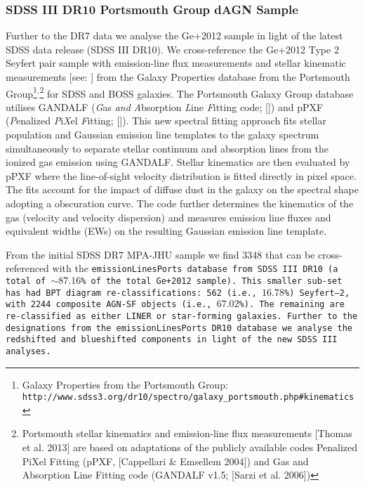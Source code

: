 \subsubsection{SDSS III DR10 Portsmouth Group dAGN Sample}

Further to the DR7 data we analyse the Ge+2012 sample in light of the latest SDSS data release (SDSS III DR10). We cross-reference the Ge+2012 Type 2 Seyfert pair sample with emission-line flux measurements and stellar kinematic measurements [see: \cite{Thomas_2013}] from the Galaxy Properties database from the Portsmouth Group\footnote{\tiny{Galaxy Properties from the Portsmouth Group: \tt{http://www.sdss3.org/dr10/spectro/galaxy_portsmouth.php#kinematics}}}$^{\text{,}}$\footnote{\tiny{Portsmouth stellar kinematics and emission-line flux measurements [Thomas et al. 2013] are based on adaptations of the publicly available codes Penalized PiXel Fitting (pPXF, [Cappellari \& Emsellem 2004]) and Gas and Absorption Line Fitting code (GANDALF v1.5; [Sarzi et al. 2006])}} for SDSS and BOSS galaxies. The Portsmouth Galaxy Group database utilises GANDALF (\textit{G}as \textit{and} \textit{A}bsorption \textit{L}ine \textit{F}itting code; [\cite{Sarzi_2006}]) and pPXF (\textit{P}enalized \textit{P}i\textit{X}el \textit{F}itting; [\cite{2012ascl.soft10002C}]). This new spectral fitting approach fits stellar population and Gaussian emission line templates to the galaxy spectrum simultaneously to separate stellar continuum and absorption lines from the ionized gas emission using GANDALF. Stellar kinematics are then evaluated by pPXF where the line-of-sight velocity distribution is fitted directly in pixel space. The fits account for the impact of diffuse dust in the galaxy on the spectral shape adopting a \cite{Calzetti_2001} obscuration curve. The code further determines the kinematics of the gas (velocity and velocity dispersion) and measures emission line fluxes and equivalent widths (EWs) on the resulting Gaussian emission line template.

From the initial SDSS DR7 MPA-JHU sample we find 3348 that can be cross-referenced with the \tt{emissionLinesPorts} database from SDSS III DR10 (a total of $\sim{87.16}$\% of the total Ge+2012 sample). This smaller sub-set has had BPT diagram re-classifications: 562 (i.e., $16.78$\%) Seyfert--2, with 2244 composite AGN-SF objects (i.e., $67.02$\%). The remaining are re-classified as either LINER or star-forming galaxies. Further to the designations from the \tt{emissionLinesPorts} DR10 database we analyse the redshifted and blueshifted components in light of the new SDSS III analyses.

